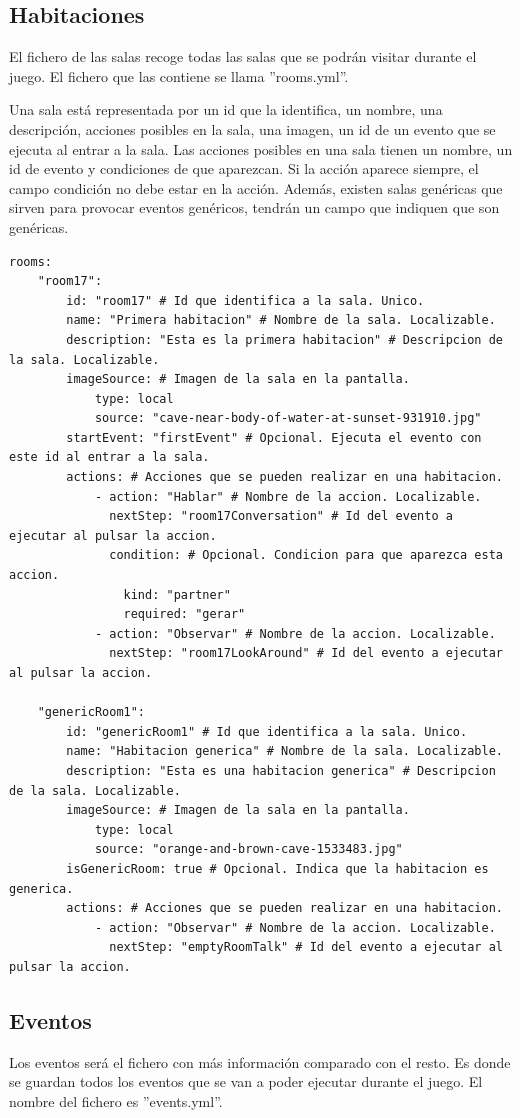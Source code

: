 \subsection{Habitaciones}
El fichero de las salas recoge todas las salas que se podrán visitar durante el juego. El fichero que las contiene se llama ''rooms.yml''.

Una sala está representada por un id que la identifica, un nombre, una descripción, acciones posibles en la sala, una imagen, un id de un evento que se ejecuta al entrar a la sala.
Las acciones posibles en una sala tienen un nombre, un id de evento y condiciones de que aparezcan. Si la acción aparece siempre, el campo condición no debe estar en la acción.
Además, existen salas genéricas que sirven para provocar eventos genéricos, tendrán un campo que indiquen que son genéricas.

\begin{lstlisting}
rooms:
	"room17":
		id: "room17" # Id que identifica a la sala. Unico.
		name: "Primera habitacion" # Nombre de la sala. Localizable.
		description: "Esta es la primera habitacion" # Descripcion de la sala. Localizable.
		imageSource: # Imagen de la sala en la pantalla.
			type: local
			source: "cave-near-body-of-water-at-sunset-931910.jpg"
		startEvent: "firstEvent" # Opcional. Ejecuta el evento con este id al entrar a la sala.
		actions: # Acciones que se pueden realizar en una habitacion.
			- action: "Hablar" # Nombre de la accion. Localizable.
			  nextStep: "room17Conversation" # Id del evento a ejecutar al pulsar la accion.
			  condition: # Opcional. Condicion para que aparezca esta accion.
				kind: "partner"
				required: "gerar"
			- action: "Observar" # Nombre de la accion. Localizable.
			  nextStep: "room17LookAround" # Id del evento a ejecutar al pulsar la accion.

	"genericRoom1":
		id: "genericRoom1" # Id que identifica a la sala. Unico.
		name: "Habitacion generica" # Nombre de la sala. Localizable.
		description: "Esta es una habitacion generica" # Descripcion de la sala. Localizable.
		imageSource: # Imagen de la sala en la pantalla.
			type: local
			source: "orange-and-brown-cave-1533483.jpg"
		isGenericRoom: true # Opcional. Indica que la habitacion es generica.
		actions: # Acciones que se pueden realizar en una habitacion.
			- action: "Observar" # Nombre de la accion. Localizable.
		 	  nextStep: "emptyRoomTalk" # Id del evento a ejecutar al pulsar la accion.
\end{lstlisting}

\subsection{Eventos}
Los eventos será el fichero con más información comparado con el resto. Es donde se guardan todos los eventos que se van a poder ejecutar durante el juego. El nombre del fichero es ''events.yml''.

